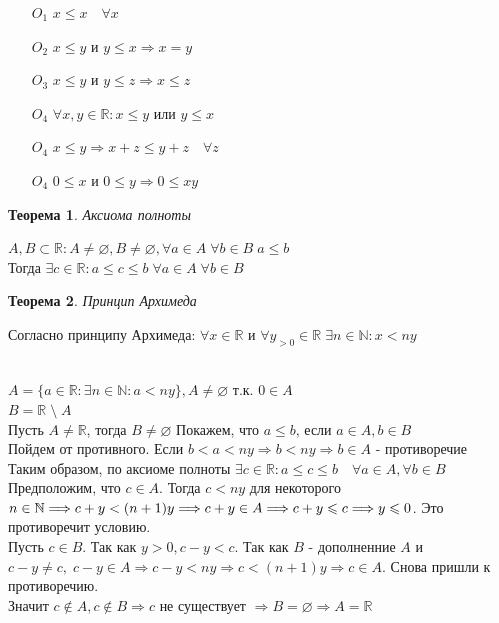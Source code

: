 \documentclass[12pt,letterpaper]{report}
\makeatletter
\newtheorem*{theorem-non}{Теорема}
\theoremstyle{definition}
\renewenvironment{proof}[1][\proofname]{%
   \par\pushQED{\qed}\normalfont%
   \topsep6\p@\@plus6\p@\relax
   \trivlist\item[\hskip\labelsep\bfseries#1\@addpunct{.}]%
   \ignorespaces
}{%
   \popQED\endtrivlist\@endpefalse
}
\makeatother
\begin{document}
\begin{itemize}
    \item[$O_1$] $x \leqslant x \quad \forall x$
    \item[$O_2$] $x \leqslant y $  и  $ y \leqslant x \Longrightarrow x = y$ 
    \item[$O_3$] $x \leqslant y $  и  $ y \leqslant z \Longrightarrow x \leqslant z$ 
    \item[$O_4$] $\forall x, y \in \mathbb{R} : x \leqslant y $ или $ y \leqslant x$
    \item[$O_4$] $x \leqslant y \Longrightarrow x + z \leqslant y + z \quad \forall z$ 
    \item[$O_4$] $0 \leqslant x $ и $ 0 \leqslant y \Longrightarrow 0 \leqslant xy$  
\end{itemize}
\begin{theorem-non}
    Аксиома полноты
\end{theorem-non}
$A, B \subset \mathbb{R} : A \neq \varnothing, B \neq \varnothing, \forall a \in A \; \forall b \in B \; a \leqslant b$ \\
Тогда $\exists c \in \mathbb{R} : a \leqslant c \leqslant b \; \forall a \in A \; \forall b \in B$
\begin{theorem-non}
    Принцип Архимеда
\end{theorem-non}
Согласно принципу Архимеда: $\forall x \in \mathbb{R}$ и $\forall y_{>0} \in \mathbb{R} \; \exists n \in \mathbb{N} : x < ny$
\begin{proof}  
    \quad \\ $A = \{a \in \mathbb{R} : \exists n \in \mathbb{N} : a < ny\}, A \neq \varnothing$ т.к. $0 \in A$ \\
    $B = \mathbb{R} \; \setminus \; A$ \\
    Пусть $A \neq \mathbb{R}$, тогда $B \neq \varnothing$ Покажем, что $a \leqslant b$, если $a \in A, b \in B$ \\
    Пойдем от противного. Если $b < a < ny \Longrightarrow b < ny \Longrightarrow b \in A$ - противоречие \\
    Таким образом, по аксиоме полноты $\exists c \in \mathbb{R} : a \leqslant c \leqslant b \quad \forall a \in A, \forall b \in B$ \\
    Предположим, что $c \in A$. Тогда $c < ny$ для некоторого $n \in \mathbb{N} \Longrightarrow c + y < (n + 1)y \Longrightarrow \\ 
    c + y \in A \Longrightarrow c + y \leqslant c \Longrightarrow y \leqslant 0$. Это противоречит условию. \\
    Пусть $c \in B$. Так как $y > 0, c - y < c$. Так как $B$ - дополненние $A$ и $c - y \neq c, \; c - y \in A
    \Longrightarrow c - y < ny \Longrightarrow c < (n + 1)y \Longrightarrow c \in A$. Снова пришли к противоречию. \\
    Значит $c \notin A, c \notin B \Longrightarrow c$ не существует $\Longrightarrow B = \varnothing \Longrightarrow A = \mathbb{R}$ 
\end{proof}
\end{document}
